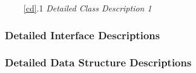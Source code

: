 \documentclass{article}
\begin{document}

\begin{enumerate}
    \item[~\ref{cd}.1 ] \emph{Detailed Class Description 1}
\end{enumerate}

\subsubsection{Detailed Interface Descriptions}
\label{did}


\subsubsection{Detailed Data Structure Descriptions}
\label{ddsd}

\end{document}
